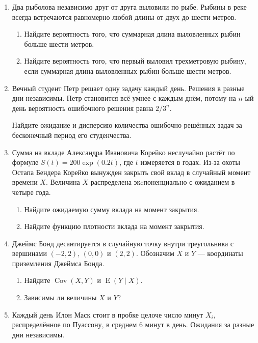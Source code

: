 \documentclass[12pt]{article}
\DeclareMathOperator{\Cov}{Cov}
\DeclareMathOperator{\E}{E}
\begin{document}
\begin{enumerate}
  \item Два рыболова независимо друг от друга выловили по рыбе. 
  Рыбины в реке всегда встречаются равномерно любой длины от двух до шести метров.  

  \begin{enumerate}
    \item Найдите вероятность того, что суммарная длина выловленных рыбин больше шести метров.
    \item Найдите вероятность того, что первый выловил трехметровую рыбину, если суммарная длина выловленных рыбин больше шести метров.
  \end{enumerate}

  \item Вечный студент Петр решает одну задачу каждый день. Решения в разные дни независимы. 
  Петр становится всё умнее с каждым днём, потому на $n$-ый день вероятность ошибочного решения равна $2/3^n$. 
  

  Найдите ожидание и дисперсию количества ошибочно решённых задач за бесконечный период его студенчества. 

  \item Сумма на вкладе Александра Ивановича Корейко неслучайно растёт по формуле $S(t) = 200\exp(0.2t)$, где $t$ измеряется в годах. 
  Из-за охоты Остапа Бендера Корейко вынужден закрыть свой вклад в случайный момент времени $X$. 
  Величина $X$ распределена экcпоненциально с ожиданием в четыре года.

  \begin{enumerate}
    \item Найдите ожидаемую сумму вклада на момент закрытия. 
    \item Найдите функцию плотности вклада на момент закрытия. 
  \end{enumerate}

  \item Джеймс Бонд десантируется в случайную точку внутри треугольника с вершинами $(-2, 2)$, $(0, 0)$
  и $(2, 2)$. Обозначим $X$ и $Y$ — координаты приземления Джеймса Бонда. 

  \begin{enumerate}
    \item Найдите $\Cov(X, Y)$ и $\E(Y \mid X)$.
    \item Зависимы ли величины $X$ и $Y$?
  \end{enumerate}

  \item Каждый день Илон Маск стоит в пробке целоче число минут $X_i$, распределённое по Пуассону, в среднем 6 минут в день. 
  Ожидания за разные дни независимы. 


\end{enumerate}
\end{document}
